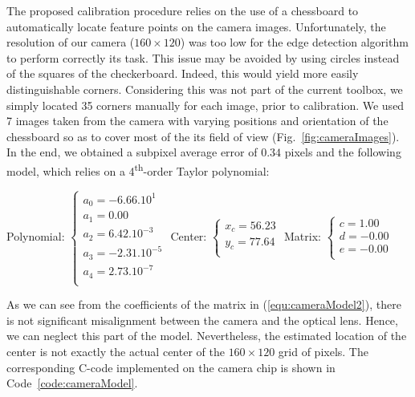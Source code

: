 The proposed calibration procedure relies on the use of a chessboard to automatically locate feature points on the camera images. Unfortunately, the resolution of our camera ($160 \times 120$) was too low for the edge detection algorithm to perform correctly its task. This issue may be avoided by using circles instead of the squares of the checkerboard. Indeed, this would yield more easily distinguishable corners. Considering this was not part of the current toolbox, we simply located 35 corners manually for each image, prior to calibration. We used 7 images taken from the camera with varying positions and orientation of the chessboard so as to cover most of the its field of view (Fig.~\ref{fig:cameraImages}). In the end, we obtained a subpixel average error of $0.34$ pixels and the following model, which relies on a 4\textsuperscript{th}-order Taylor polynomial:\\
\begin{center}
Polynomial:
$
\begin{cases}
a_0 = -6.66 . 10^{1}\\ 
a_1 = 0.00 \\
a_2 = 6.42 . 10^{-3} \\
a_3 = -2.31 . 10^{-5} \\
a_4 = 2.73 . 10^{-7} \\
\end{cases}
$
\hfill
Center:
$
\begin{cases}
x_c = 56.23 \\
y_c = 77.64 \\
\end{cases}
$
\hfill
Matrix:
$
\begin{cases}
c = 1.00 \\
d = -0.00 \\
e = -0.00 \\
\end{cases}
$
\end{center}
As we can see from the coefficients of the matrix in (\ref{equ:cameraModel2}), there is not significant misalignment between the camera and the optical lens. Hence, we can neglect this part of the model. Nevertheless, the estimated location of the center is not exactly the actual center of the $160 \times 120$ grid of pixels. The corresponding C-code implemented on the camera chip is shown in Code~\ref{code:cameraModel}.

